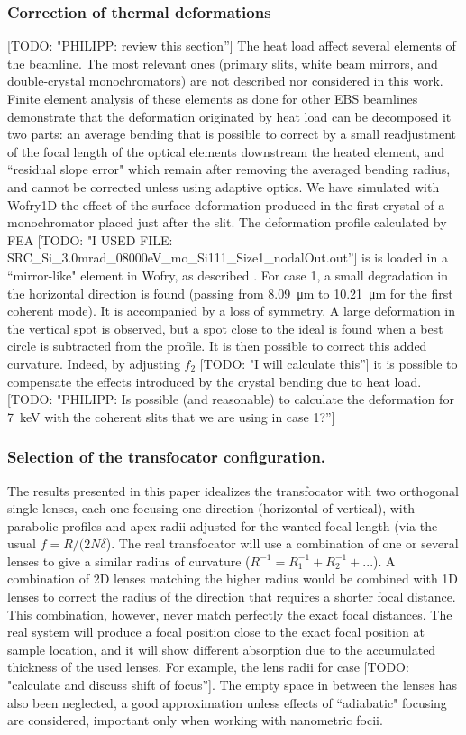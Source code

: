 \documentclass{iucr}              %
\newcommand{\todo}[1]{{\color{red}[TODO: "#1'']}}
\begin{document}
\subsubsection{Correction of thermal deformations}
\todo{PHILIPP: review this section}
The heat load affect several elements of the beamline. The most relevant ones (primary slits, white beam mirrors, and double-crystal monochromators) are not described nor considered in this work. Finite element analysis of these elements as done for other EBS beamlines \cite{Brumund} demonstrate that the deformation originated by heat load can be decomposed it two parts: an average bending that is possible to correct by a small readjustment of the focal length of the optical elements downstream the heated element, and ``residual slope error" which remain after removing the averaged bending radius, and cannot be corrected unless using adaptive optics. We have simulated with Wofry1D the effect of the surface deformation produced in the first crystal of a monochromator placed just after the slit. The deformation profile calculated by FEA \todo{I USED FILE: SRC\_Si\_3.0mrad\_08000eV\_mo\_Si111\_Size1\_nodalOut.out} is is loaded in a ``mirror-like" element in Wofry, as described \cite{srioLBL}. For case 1, a small degradation in the horizontal direction is found (passing from \SI{8.09}{\micro\meter} to \SI{10.21}{\micro\meter} for the first coherent mode). It is accompanied by a loss of symmetry. A large deformation in the vertical spot is observed, but a spot close to the ideal is found when a best circle is subtracted from the profile. It is then possible to correct this added curvature. Indeed, by adjusting $f_2$ \todo{I will calculate this} it is possible to compensate the effects introduced by the crystal bending due to heat load.
\todo{PHILIPP: Is possible (and reasonable) to calculate the deformation for \SI{7}{keV} with the coherent slits that we are using in case 1?}   

\subsubsection{Selection of the transfocator configuration.} 
The results presented in this paper idealizes the transfocator with two orthogonal single lenses, each one focusing one direction (horizontal of vertical), with parabolic profiles and apex radii adjusted for the wanted focal length (via the usual $f=R/(2 N \delta$). The real transfocator will use a combination of one or several lenses to give a similar radius of curvature  ($R^{-1} = R_1^{-1} + R_2^{-1} + ...$). A combination of 2D lenses matching the higher radius would be combined with 1D lenses to correct the radius of the direction that requires a shorter focal distance. This combination, however, never match perfectly the exact focal distances. The real system will produce a focal position close to the exact focal position at sample location, and it will show different absorption due to the accumulated thickness of the used lenses. For example, the lens radii for case \todo{calculate and discuss shift of focus}. The empty space in between the lenses has also been neglected, a good approximation unless effects of ``adiabatic" focusing are considered, important only when working with nanometric focii.    
\end{document}
